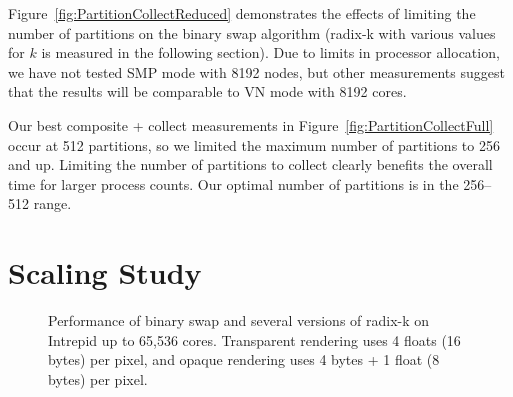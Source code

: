 \documentclass{sig-alternate}
\begin{document}
Figure~\ref{fig:PartitionCollectReduced} demonstrates the effects of
limiting the number of partitions on the binary swap algorithm (radix-k
with various values for $k$ is measured in the following section).  Due to
limits in processor allocation, we have not tested SMP mode with 8192
nodes, but other measurements suggest that the results will be comparable
to VN mode with 8192 cores.

Our best composite + collect measurements in
Figure~\ref{fig:PartitionCollectFull} occur at 512 partitions, so we
limited the maximum number of partitions to 256 and up.  Limiting the
number of partitions to collect clearly benefits the overall time for
larger process counts.  Our optimal number of partitions is in the 256--512
range.

\section{Scaling Study}
\label{sec:Scaling}

\begin{figure}[htbp]
  \centering
  \hfill
  \caption{Performance of binary swap and several versions of radix-k on
    Intrepid up to 65,536 cores.  Transparent rendering uses 4 floats (16
    bytes) per pixel, and opaque rendering uses 4 bytes + 1 float (8 bytes)
    per pixel.}
  \label{fig:Scaling}
\end{figure}
\end{document}
